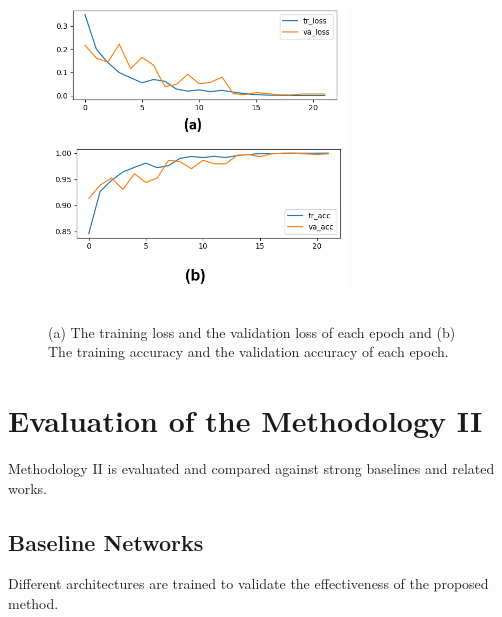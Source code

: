 \begin{figure}
\begin{center}
\includegraphics[height=90mm,width=8.0cm]{Figures/fig6.png}
\caption{(a) The training loss and the validation loss of each epoch and (b) The training accuracy and the validation accuracy of each epoch.}\label{fig5}\end{center}\end{figure}



\section{Evaluation of the Methodology II}
Methodology II is evaluated and compared against strong baselines and related works. 

\subsection{Baseline Networks}
Different architectures are trained to validate the effectiveness of the proposed method. 
